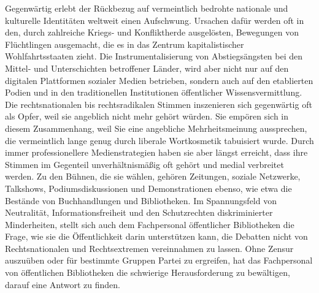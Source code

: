 Gegenwärtig erlebt der Rückbezug auf vermeintlich bedrohte nationale und
kulturelle Identitäten weltweit einen Aufschwung. Ursachen dafür werden
oft in den, durch zahlreiche Kriegs- und Konfliktherde ausgelösten,
Bewegungen von Flüchtlingen ausgemacht, die es in das Zentrum
kapitalistischer Wohlfahrtsstaaten zieht. Die Instrumentalisierung von
Abstiegsängsten bei den Mittel- und Unterschichten betroffener Länder,
wird aber nicht nur auf den digitalen Plattformen sozialer Medien
betrieben, sondern auch auf den etablierten Podien und in den
traditionellen Institutionen öffentlicher Wissensvermittlung. Die
rechtsnationalen bis rechtsradikalen Stimmen inszenieren sich
gegenwärtig oft als Opfer, weil sie angeblich nicht mehr gehört würden.
Sie empören sich in diesem Zusammenhang, weil Sie eine angebliche
Mehrheitsmeinung aussprechen, die vermeintlich lange genug durch
liberale Wortkosmetik tabuisiert wurde. Durch immer professionellere
Medienstrategien haben sie aber längst erreicht, dass ihre Stimmen im
Gegenteil unverhältnismäßig oft gehört und medial verbreitet werden. Zu
den Bühnen, die sie wählen, gehören Zeitungen, soziale Netzwerke,
Talkshows, Podiumsdiskussionen und Demonstrationen ebenso, wie etwa die
Bestände von Buchhandlungen und Bibliotheken. Im Spannungsfeld von
Neutralität, Informationsfreiheit und den Schutzrechten diskriminierter
Minderheiten, stellt sich auch dem Fachpersonal öffentlicher
Bibliotheken die Frage, wie sie die Öffentlichkeit darin unterstützen
kann, die Debatten nicht von Rechtsnationalen und Rechtsextremen
vereinnahmen zu lassen. Ohne Zensur auszuüben oder für bestimmte Gruppen
Partei zu ergreifen, hat das Fachpersonal von öffentlichen Bibliotheken
die schwierige Herausforderung zu bewältigen, darauf eine Antwort zu
finden.
